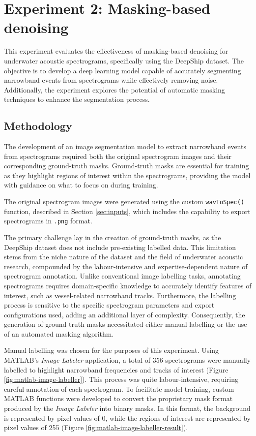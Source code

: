 \section{Experiment 2: Masking-based denoising}

This experiment evaluates the effectiveness of masking-based denoising for underwater acoustic spectrograms, specifically using the DeepShip dataset. The objective is to develop a deep learning model capable of accurately segmenting narrowband events from spectrograms while effectively removing noise. Additionally, the experiment explores the potential of automatic masking techniques to enhance the segmentation process.

\subsection{Methodology}

The development of an image segmentation model to extract narrowband events from spectrograms required both the original spectrogram images and their corresponding ground-truth masks. Ground-truth masks are essential for training as they highlight regions of interest within the spectrograms, providing the model with guidance on what to focus on during training.

The original spectrogram images were generated using the custom \texttt{wavToSpec()} function, described in Section \ref{sec:inputs}, which includes the capability to export spectrograms in \texttt{.png} format.

The primary challenge lay in the creation of ground-truth masks, as the DeepShip dataset does not include pre-existing labelled data. This limitation stems from the niche nature of the dataset and the field of underwater acoustic research, compounded by the labour-intensive and expertise-dependent nature of spectrogram annotation. Unlike conventional image labelling tasks, annotating spectrograms requires domain-specific knowledge to accurately identify features of interest, such as vessel-related narrowband tracks. Furthermore, the labelling process is sensitive to the specific spectrogram parameters and export configurations used, adding an additional layer of complexity. Consequently, the generation of ground-truth masks necessitated either manual labelling or the use of an automated masking algorithm.

Manual labelling was chosen for the purposes of this experiment. Using MATLAB's \textit{Image Labeler} application, a total of 356 spectrograms were manually labelled to highlight narrowband frequencies and tracks of interest (Figure \ref{fig:matlab-image-labeller}). This process was quite labour-intensive, requiring careful annotation of each spectrogram. To facilitate model training, custom MATLAB functions were developed to convert the proprietary mask format produced by the \textit{Image Labeler} into binary masks. In this format, the background is represented by pixel values of 0, while the regions of interest are represented by pixel values of 255 (Figure \ref{fig:matlab-image-labeller-result}).

